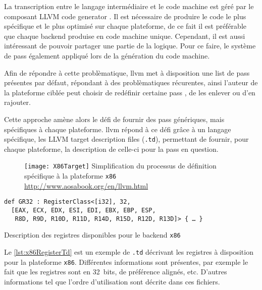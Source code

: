 La transcription entre le langage intermédiaire et le code machine est géré par le composant \og LLVM code generator \fg. Il est nécessaire de produire le code le plus spécifique et le plus optimisé sur chaque plateforme, de ce fait il est préférable que chaque \og backend \fg produise en code machine unique. Cependant, il est aussi intéressant de pouvoir partager une partie de la logique. Pour ce faire, le système de \og pass \fg également appliqué lors de la génération du code machine.

Afin de répondre à cette problèmatique, \gls{llvm} met à disposition une list de \og pass \fg présentes par défaut, répondant à des problèmatiques récurentes, ainsi l'auteur de la plateforme ciblée peut choisir de redéfinir certaine \og pass \fg, de les enlever ou d'en rajouter.

Cette approche amène alors le défi de fournir des \og pass \fg génériques, mais spécifiques à chaque plateforme. \gls{llvm} répond à ce défi grâce à un langage spécifique, les \og LLVM target description files \fg (\texttt{.td}), permettant de fournir, pour chaque plateforme, la description de celle-ci pour la \og pass \fg en question.

\begin{figure}[H]
	\centering
	\texttt{[image: X86Target]}
	{Simplification du processus de définition spécifique à la plateforme \texttt{x86}}
	{\url{http://www.aosabook.org/en/llvm.html}}
	\label{fig:X86Target}
\end{figure}

\vfill

\begin{listing}
	\begin{verbatim}
def GR32 : RegisterClass<[i32], 32,
  [EAX, ECX, EDX, ESI, EDI, EBX, EBP, ESP,
   R8D, R9D, R10D, R11D, R14D, R15D, R12D, R13D]> { … }
	\end{verbatim}
	\caption{Description des registres disponibles pour le \og backend \fg \texttt{x86}}
	\label{lst:x86RegisterTd}
\end{listing}

Le \autoref{lst:x86RegisterTd} est un exemple de \texttt{.td} décrivant les registres à disposition pour la plateforme \texttt{x86}. Différentes informations sont présentes, par exemple le fait que les registres sont en 32~bits, de préférence alignés, etc. D'autres informations tel que l'ordre d'utilisation sont décrite dans ces fichiers.


